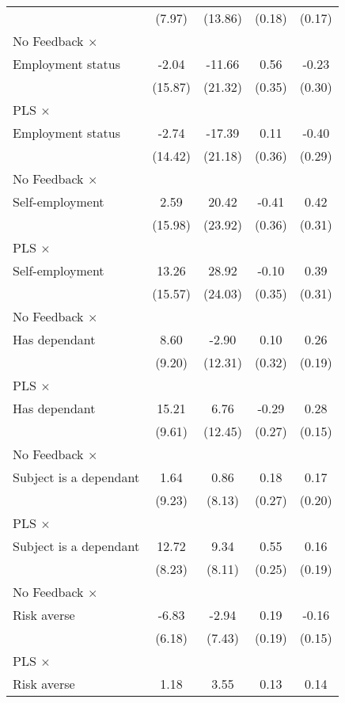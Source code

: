 \begin{table}[htbp]
\begin{tabular}{l*{4}{c}}
                &   (7.97)&  (13.86)&   (0.18)&   (0.17)\\
\addlinespace
No Feedback $\times$ \\ Employment status&    -2.04&   -11.66&     0.56&    -0.23\\
                &  (15.87)&  (21.32)&   (0.35)&   (0.30)\\
\addlinespace
PLS $\times$ \\ Employment status&    -2.74&   -17.39&     0.11&    -0.40\\
                &  (14.42)&  (21.18)&   (0.36)&   (0.29)\\
\addlinespace
No Feedback $\times$ \\ Self-employment&     2.59&    20.42&    -0.41&     0.42\\
                &  (15.98)&  (23.92)&   (0.36)&   (0.31)\\
\addlinespace
PLS $\times$ \\ Self-employment&    13.26&    28.92&    -0.10&     0.39\\
                &  (15.57)&  (24.03)&   (0.35)&   (0.31)\\
\addlinespace
No Feedback $\times$ \\ Has dependant&     8.60&    -2.90&     0.10&     0.26\\
                &   (9.20)&  (12.31)&   (0.32)&   (0.19)\\
\addlinespace
PLS $\times$ \\ Has dependant&    15.21&     6.76&    -0.29&     0.28\\
                &   (9.61)&  (12.45)&   (0.27)&   (0.15)\\
\addlinespace
No Feedback $\times$ \\ Subject is a dependant&     1.64&     0.86&     0.18&     0.17\\
                &   (9.23)&   (8.13)&   (0.27)&   (0.20)\\
\addlinespace
PLS $\times$ \\ Subject is a dependant&    12.72&     9.34&     0.55&     0.16\\
                &   (8.23)&   (8.11)&   (0.25)&   (0.19)\\
\addlinespace
No Feedback $\times$ \\ Risk averse&    -6.83&    -2.94&     0.19&    -0.16\\
                &   (6.18)&   (7.43)&   (0.19)&   (0.15)\\
\addlinespace
PLS $\times$ \\ Risk averse&     1.18&     3.55&     0.13&     0.14\\

\end{tabular}
\end{table}
